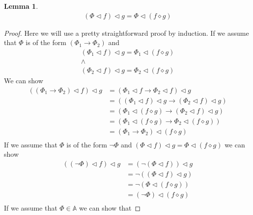\documentclass{article}
\newtheorem{lem}{Lemma}
\begin{document}
\begin{lem}
\begin{align*}
(\Phi \lhd f) \lhd g = \Phi \lhd (f \diamond g)
\end{align*}
\end{lem}
\begin{proof}
Here we will use a pretty straightforward proof by induction.
If we assume that $\Phi$ is of the form $(\Phi_1 \rightarrow \Phi_2)$ and
\begin{gather*}
(\Phi_1 \lhd f) \lhd g = \Phi_1 \lhd (f \diamond g) \\
\land \\
(\Phi_2 \lhd f) \lhd g = \Phi_2 \lhd (f \diamond g)
\end{gather*}
We can show
\begin{align*}
((\Phi_1 \rightarrow \Phi_2) \lhd f) \lhd g &= (\Phi_1 \lhd f \rightarrow \Phi_2 \lhd f) \lhd g                     \tag{Definition of Assignment}\\
                                            &= ((\Phi_1 \lhd f) \lhd g \rightarrow (\Phi_2 \lhd f) \lhd g)          \tag{Definition of Assignment}\\
                                            &= (\Phi_1 \lhd (f \diamond g) \rightarrow (\Phi_2 \lhd f) \lhd g)      \tag{Inductive Hypothesis I}\\
                                            &= (\Phi_1 \lhd (f \diamond g) \rightarrow \Phi_2 \lhd (f \diamond g))  \tag{Inductive Hypothesis II}\\
                                            &= (\Phi_1 \rightarrow \Phi_2) \lhd (f \diamond g)                      \tag{Definition of Assignment}\\
\end{align*}
If we assume that $\Phi$ is of the form $\neg\Phi$ and $(\Phi \lhd f) \lhd g = \Phi \lhd (f \diamond g)$ we can show
\begin{align*}
((\neg \Phi) \lhd f) \lhd g &= (\neg (\Phi \lhd f)) \lhd g     \tag{Definition of Assignment} \\
                            &= \neg ((\Phi \lhd f) \lhd g)     \tag{Definition of Assignment} \\
                            &= \neg (\Phi \lhd (f \diamond g)) \tag{Inductive Hypothesis}     \\
                            &= (\neg \Phi) \lhd (f \diamond g) \tag{Definition of Assignment} \\
\end{align*}
If we assume that $\Phi \in \mathbb{A}$ we can show that

\end{proof}
\end{document}
